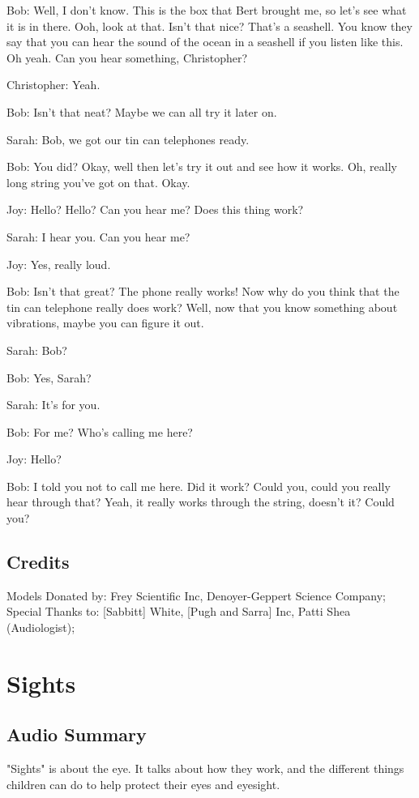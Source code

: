 Bob: Well, I don't know. This is the box that Bert brought me, so let's see what it is in there. Ooh, look at that. Isn't that nice? That's a seashell. You know they say that you can hear the sound of the ocean in a seashell if you listen like this. Oh yeah. Can you hear something, Christopher?

Christopher: Yeah.

Bob: Isn't that neat? Maybe we can all try it later on.

Sarah: Bob, we got our tin can telephones ready.

Bob: You did? Okay, well then let's try it out and see how it works. Oh, really long string you've got on that. Okay.

Joy: Hello? Hello? Can you hear me? Does this thing work?

Sarah: I hear you. Can you hear me?

Joy: Yes, really loud.

Bob: Isn't that great? The phone really works! Now why do you think that the tin can telephone really does work? Well, now that you know something about vibrations, maybe you can figure it out.

Sarah: Bob?

Bob: Yes, Sarah?

Sarah: It's for you.

Bob: For me? Who's calling me here?

Joy: Hello?

Bob: I told you not to call me here. Did it work? Could you, could you really hear through that? Yeah, it really works through the string, doesn't it? Could you?

\subsection{Credits}

Models Donated by: Frey Scientific Inc, Denoyer-Geppert Science Company;
Special Thanks to: [Sabbitt] White, [Pugh and Sarra] Inc, Patti Shea (Audiologist);

\section{Sights}

\subsection{Audio Summary}

"Sights" is about the eye. It talks about how they work, and the different things children can do to help protect their eyes and eyesight.

